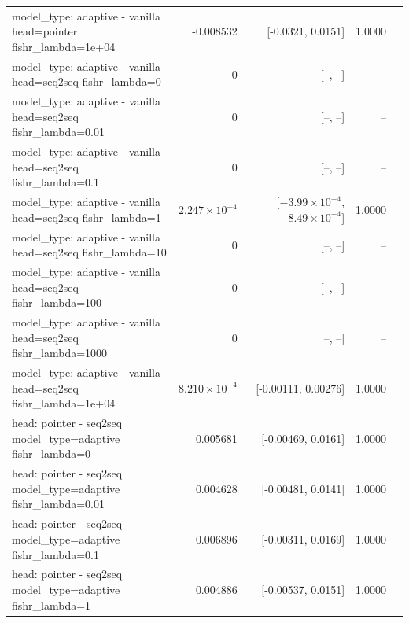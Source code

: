 \documentclass[10pt]{article}
\makeatletter
\newcommand{\stackcell}[1]{\begin{tabular}[t]{@{}l@{}}#1\end{tabular}}
\makeatother
\begin{document}
{\begin{longtable}{lrrrl}
\stackcell{model\_type: adaptive - vanilla\\\footnotesize head=pointer fishr\_lambda=1e+04 } & -0.008532 & [-0.0321, 0.0151] & 1.0000 & \\
\stackcell{model\_type: adaptive - vanilla\\\footnotesize head=seq2seq fishr\_lambda=0 } & 0 & [--, --] & -- & \\
\stackcell{model\_type: adaptive - vanilla\\\footnotesize head=seq2seq fishr\_lambda=0.01 } & 0 & [--, --] & -- & \\
\stackcell{model\_type: adaptive - vanilla\\\footnotesize head=seq2seq fishr\_lambda=0.1 } & 0 & [--, --] & -- & \\
\stackcell{model\_type: adaptive - vanilla\\\footnotesize head=seq2seq fishr\_lambda=1 } & $2.247\times10^{-4}$ & [$-3.99\times10^{-4}$, $8.49\times10^{-4}$] & 1.0000 & \\
\stackcell{model\_type: adaptive - vanilla\\\footnotesize head=seq2seq fishr\_lambda=10 } & 0 & [--, --] & -- & \\
\stackcell{model\_type: adaptive - vanilla\\\footnotesize head=seq2seq fishr\_lambda=100 } & 0 & [--, --] & -- & \\
\stackcell{model\_type: adaptive - vanilla\\\footnotesize head=seq2seq fishr\_lambda=1000 } & 0 & [--, --] & -- & \\
\stackcell{model\_type: adaptive - vanilla\\\footnotesize head=seq2seq fishr\_lambda=1e+04 } & $8.210\times10^{-4}$ & [-0.00111, 0.00276] & 1.0000 & \\
\stackcell{head: pointer - seq2seq\\\footnotesize model\_type=adaptive fishr\_lambda=0 } & 0.005681 & [-0.00469, 0.0161] & 1.0000 & \\
\stackcell{head: pointer - seq2seq\\\footnotesize model\_type=adaptive fishr\_lambda=0.01 } & 0.004628 & [-0.00481, 0.0141] & 1.0000 & \\
\stackcell{head: pointer - seq2seq\\\footnotesize model\_type=adaptive fishr\_lambda=0.1 } & 0.006896 & [-0.00311, 0.0169] & 1.0000 & \\
\stackcell{head: pointer - seq2seq\\\footnotesize model\_type=adaptive fishr\_lambda=1 } & 0.004886 & [-0.00537, 0.0151] & 1.0000 & \\

\end{longtable}}
\end{document}
